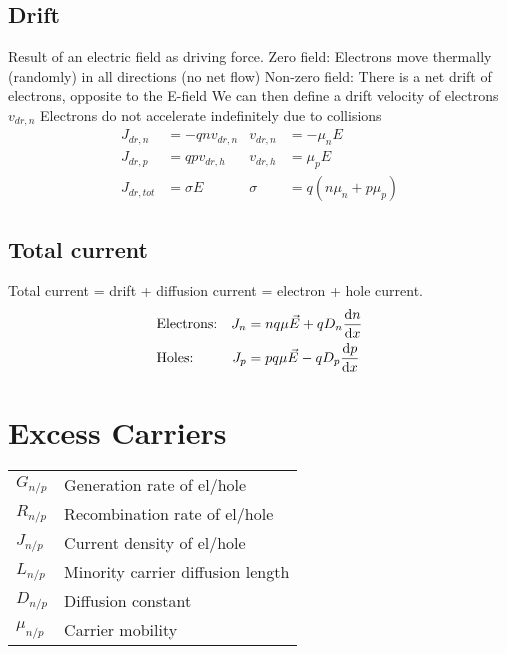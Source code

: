 \documentclass[a4paper, fontsize=8pt, landscape, DIV=1]{scrartcl}
\begin{document}
\begin{multicols*}{4}
  \subsection{Drift}
    \ifdefined\makeultracompact\else
      Result of an electric field as driving force.
      Zero field: Electrons move thermally (randomly) in all directions (no net flow)
      Non-zero field: There is a net drift of electrons, opposite to the E-field
      We can then define a drift velocity of electrons $v_{dr,n}$
      Electrons do not accelerate indefinitely due to collisions
    \fi
    \begin{align*}
      J_{dr,n} &= -qnv_{dr,n} & v_{dr,n} &= -\mu_nE \\
      J_{dr,p} &= qpv_{dr,h} & v_{dr,h} &= \mu_pE \\
      J_{dr,tot} &= \sigma E & \sigma &= q(n\mu_n + p\mu_p)
    \end{align*}
  
  \subsection{Total current}
    Total current = drift + diffusion current = electron + hole current.
    \begin{align*}
      &\text{Electrons:} & J_n &= nq\mu\vec{E}+qD_n\frac{\mathrm{d}n}{\mathrm{d}x} \\
      &\text{Holes:} & J_p &= pq\mu\vec{E}-qD_p\frac{\mathrm{d}p}{\mathrm{d}x} \\
    \end{align*}

  \section{Excess Carriers}
   
  \ifdefined\makeultracompact
  \else
    \begin{tabular}[h]{l l}
      $G_{n/p}$   & Generation rate of el/hole \\
      $R_{n/p}$   & Recombination rate of el/hole \\
      $J_{n/p}$   & Current density of el/hole \\
      $L_{n/p}$   & Minority carrier diffusion length \\
      $D_{n/p}$   & Diffusion constant \\
      $\mu_{n/p}$ & Carrier mobility \\
    \end{tabular}
  \fi


\end{multicols*}
\end{document}
